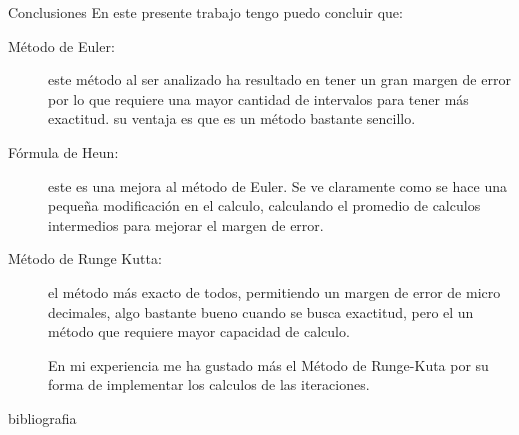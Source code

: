 \documentclass[letterpaper, 12pt]{article}
\begin{document}
  \begin{section}{Conclusiones}
    En este presente trabajo tengo puedo concluir que:
    \begin{description}
      \item[Método de Euler:] este método al ser analizado ha resultado en tener un gran margen de error por lo que requiere una mayor cantidad de intervalos para tener más exactitud. su ventaja es que es un método bastante sencillo.
      \item[Fórmula de Heun:] este es una mejora al método de Euler. Se ve claramente como se hace una pequeña modificación en el calculo, calculando el promedio de calculos intermedios para mejorar el margen de error.
      \item[Método de Runge Kutta:] el método más exacto de todos, permitiendo un margen de error de micro decimales, algo bastante bueno cuando se busca exactitud, pero el un método que requiere mayor capacidad de calculo.

      En mi experiencia me ha gustado más el Método de Runge-Kuta por su forma de implementar los calculos de las iteraciones.
    \end{description}
  \end{section}
  \newpage
  \nocite{*}
  \begin{bibliography}{bibliografia}
    
  \end{bibliography}
\end{document}
